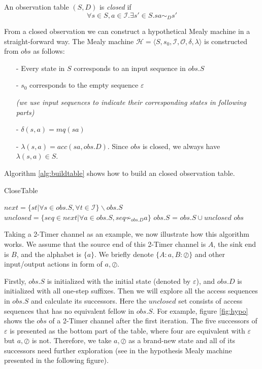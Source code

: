 \documentclass[conference, a4paper]{IEEEtran}
\newcommand{\rnoread}[0]{\oslash}
\begin{document}
An observation table $(S,D)$ is \emph{closed} if 
\[
\forall s\in S,a\in\mathcal{I}.\exists s'\in S. sa\sim_D s'
\]

From a closed observation we can construct a hypothetical Mealy machine in a straight-forward way.
The Mealy machine $\mathcal{H}=\langle S,s_0,\mathcal{I},\mathcal{O},\delta,\lambda\rangle$ is
constructed from $obs$ as follows:
\begin{itemize}
  \item[-] Every state in $S$ corresponds to an input sequence in $obs.S$
  \item[-] $s_0$ corresponds to the empty sequence $\varepsilon$
    
    \emph{(we use input sequences to indicate their corresponding states in following parts)}
  \item[-] $\delta(s,a)=mq(sa)$
  \item[-] $\lambda(s,a)=acc(sa,obs.D)$. Since $obs$ is closed, we always have $\lambda(s,a)\in S$.
\end{itemize}

Algorithm \ref{alg:buildtable} shows how to build an closed observation table.

\begin{algorithm} 
  \caption{CloseTable} 
  \label{alg:buildtable}
  \small
  {
    $next=\{st|\forall s\in obs.S,\forall t\in \mathcal{I}\}\backslash obs.S$\;
    $unclosed=\{seq\in next|\forall a\in obs.S, seq \not\sim_{obs.D} a\}$\;
    $obs.S$ = $obs.S\cup unclosed$\;
  }
  \Return $obs$\; 
\end{algorithm}

Taking a 2-Timer channel as an example, we now illustrate how this algorithm works. 
We assume that the source end of this 2-Timer channel is $A$, the sink end is $B$, and the alphabet
is $\{a\}$. We briefly denote $\{A:a,B:\rnoread\}$ and other input/output actions in form of
$a,\rnoread$.

Firstly, $obs.S$ is initialized with the initial state (denoted by $\varepsilon$), and $obs.D$ is
initialized with all one-step suffixes.
Then we will explore all the access sequences in $obs.S$ and calculate its successors. Here the
$unclosed$ set consists of access sequences that has no equivalent fellow in $obs.S$. 
For example, figure \ref{fig:hypo} shows the $obs$ of a 2-Timer channel after the first
iteration. The five successors of $\varepsilon$ is presented as the bottom part of the table, where
four are equivalent with $\varepsilon$ but $a,\rnoread$ is not. Therefore, we take $a,\rnoread$ as a
brand-new state and all of its successors need further exploration (see in the hypothesis Mealy
machine presented in the following figure).
\end{document}
